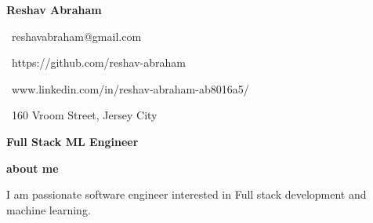\documentclass{article}
\begin{document}
\Huge\vspace{1em}\hspace{-0.30em}\textbf{Reshav Abraham} 
    \begin{minipage}[t]{0.45\textwidth\hspace{2.75em}} 
        \small
        \faEnvelopeO \, reshavabraham@gmail.com
        
        \faGithub \, https://github.com/reshav-abraham 

        \faLinkedin \, www.linkedin.com/in/reshav-abraham-ab8016a5/

        \faHome \, 160 Vroom Street, Jersey City
    \end{minipage}

\vspace{-1.3em}\Large\textbf{Full Stack ML Engineer} 

\vspace{0.3em}\small\textbf{about me} 

\begin{minipage}[t]{0.45\textwidth\hspace{0.5em}}
I am passionate software engineer interested in Full stack development
and machine learning. \par
\end{minipage}

\vspace{1.3em}
\end{document}
